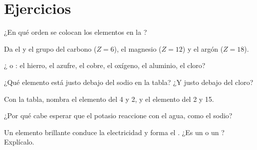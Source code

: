 \section{Ejercicios}

\begin{exercise}[$\star$]\label{exo:g9:periodic-table-first-look:1}
¿En qué orden se colocan los elementos en la ?
\end{exercise}

\begin{exercise}[$\star$]\label{exo:g9:periodic-table-first-look:2}
Da el  y el grupo del carbono ($Z = 6$), el magnesio ($Z = 12$)
y el argón ($Z = 18$).
\end{exercise}

\begin{exercise}[$\star$]\label{exo:g9:periodic-table-first-look:3}
¿ o : el hierro, el azufre, el cobre, el oxígeno, el
aluminio, el cloro?
\end{exercise}

\begin{exercise}[$\star$]\label{exo:g9:periodic-table-first-look:4}
¿Qué elemento está justo debajo del sodio en la tabla? ¿Y justo debajo
del cloro?
\end{exercise}

\begin{exercise}[$\star\star$]\label{exo:g9:periodic-table-first-look:5}
Con la tabla, nombra el elemento del  4 y  2, y el elemento
del  2 y  15.
\end{exercise}

\begin{exercise}[$\star\star$]\label{exo:g9:periodic-table-first-look:6}
¿Por qué cabe esperar que el potasio reaccione con el agua, como el
sodio?
\end{exercise}

\begin{exercise}[$\star\star$]\label{exo:g9:periodic-table-first-look:7}
Un elemento brillante conduce la electricidad y forma el 
. ¿Es un  o un ? Explícalo.
\end{exercise}

